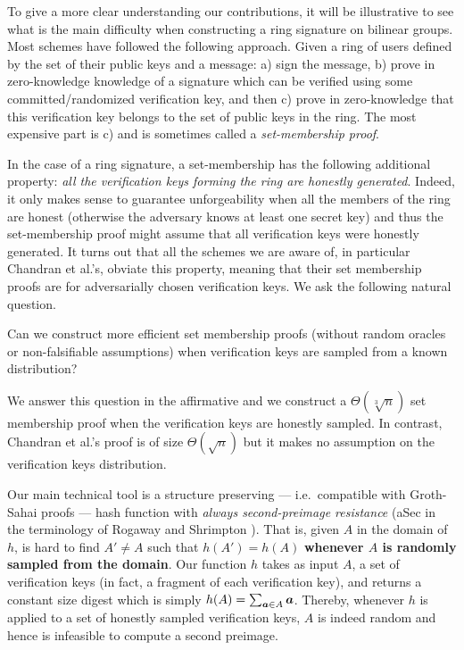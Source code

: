 
To give a more clear understanding our contributions, it will be illustrative to see what is the main difficulty when constructing a ring signature on bilinear groups. Most schemes have followed the following approach. Given a ring of users defined by the set of their public keys and a message: a) sign the message, b) prove in zero-knowledge knowledge of a signature which can be verified using some committed/randomized verification key, and then c) prove in zero-knowledge that this verification key belongs to the set of public keys in the ring.  The most expensive part is c) and is sometimes called a \emph{set-membership proof}.

In the case of a ring signature, a set-membership has the following additional property: \emph{all the verification keys forming the ring are honestly generated}. 
Indeed, it only makes sense to guarantee unforgeability when all the members of the ring are honest (otherwise the adversary knows at least one secret key) and thus the set-membership proof might assume that all verification keys were honestly generated.
It turns out that all the schemes we are aware of, in particular Chandran et al.'s, obviate this property, meaning that their set membership proofs are for adversarially chosen verification keys.
We ask the following natural question.
\begin{displayquote}
Can we construct more efficient set membership proofs (without random oracles or non-falsifiable assumptions) when verification keys are sampled from a known distribution?
\end{displayquote}
We answer this question in the affirmative and we construct a $\Theta(\sqrt[3]{n})$ set membership proof when the verification keys are honestly sampled. In contrast, Chandran et al.'s proof is of size $\Theta(\sqrt{n})$ but it makes no assumption on the verification keys distribution.

Our main technical tool is a structure preserving --- i.e.~compatible with Groth-Sahai proofs --- hash function with \emph{always second-preimage resistance} (aSec in the terminology of Rogaway and Shrimpton \cite{FSE:RogShr04}). That is, given $A$ in the domain of $h$, is hard to find $A'\neq A$ such that $h(A')=h(A)$ {\bf whenever $A$ is randomly sampled from the domain}.
Our function $h$ takes as input $A$, a set of verification keys (in fact, a fragment of each verification key), and returns a constant size digest which is simply $h(A)= \sum_{{\boldsymbol{a}} \in A} {\boldsymbol{a}}$. Thereby, whenever $h$ is applied to a set of honestly sampled verification keys, $A$ is indeed random and hence is infeasible to compute a second preimage.

